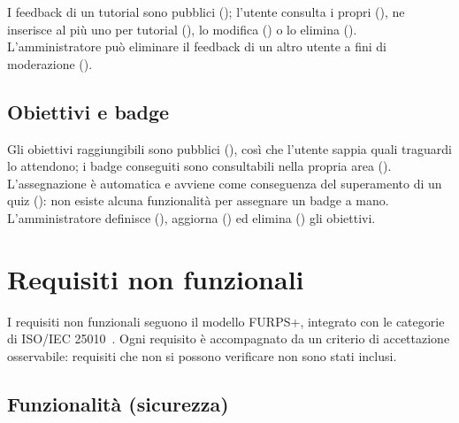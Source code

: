 I feedback di un tutorial sono pubblici (); l'utente consulta i
propri (), ne inserisce al più uno per tutorial
(), lo modifica () o lo elimina ().
L'amministratore può eliminare il feedback di un altro utente a fini di
moderazione ().

\subsection{Obiettivi e badge}

Gli obiettivi raggiungibili sono pubblici (), così che l'utente
sappia quali traguardi lo attendono; i badge conseguiti sono consultabili
nella propria area (). L'assegnazione è automatica e avviene
come conseguenza del superamento di un quiz (): non esiste
alcuna funzionalità per assegnare un badge a mano. L'amministratore definisce
(), aggiorna () ed elimina () gli
obiettivi.

\section{Requisiti non funzionali}
\label{sec:rad-rnf}

I requisiti non funzionali seguono il modello FURPS+, integrato con le
categorie di ISO/IEC 25010~\cite{iso25010}. Ogni requisito è accompagnato da
un criterio di accettazione osservabile: requisiti che non si possono
verificare non sono stati inclusi.

\subsection{Funzionalità (sicurezza)}

